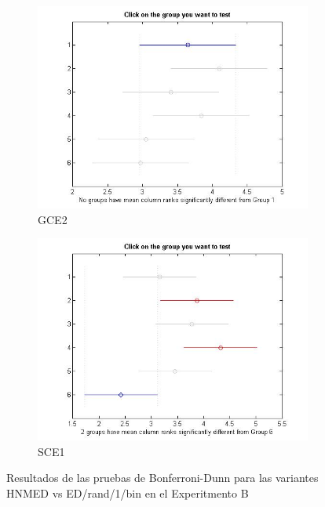 \begin{figure}
\begin{subfigure}[b]{0.49\linewidth}
		\includegraphics[width=\linewidth]{Figures/Bonferroni_HNMED_VS_ED_P5}
		\caption{GCE2} \label{fig:Bon_G2} 
	\end{subfigure}
	\begin{subfigure}[b]{0.49\linewidth}
		\includegraphics[width=\linewidth]{Figures/Bonferroni_HNMED_VS_ED_P6}
		\caption{SCE1} \label{fig:Bon_S1} 
	\end{subfigure}
	\caption{Resultados de las pruebas de Bonferroni-Dunn para las variantes HNMED vs ED/rand/1/bin en el Experitmento B} \label{fig: Resultados de las pruebas de Bonferroni-Dunn para las variantes HNMED vs ED/rand/1/bin en el Experitmento B} 
	
\end{figure}
%


